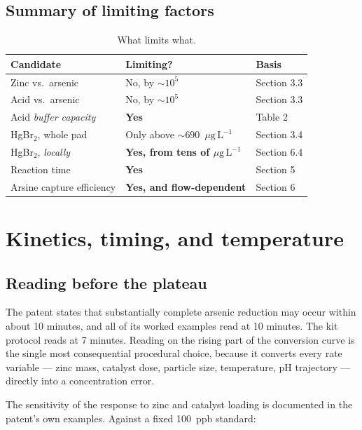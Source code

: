 \documentclass[11pt,a4paper]{article}
\newcommand{\ptl}{\ensuremath{\mu\mathrm{g\,L^{-1}}}}
\begin{document}
\subsection{Summary of limiting factors}

\begin{table}[h]
\centering
\caption{What limits what.}
\begin{tabular}{lll}
\toprule
Candidate & Limiting? & Basis \\
\midrule
Zinc vs.\ arsenic       & No, by $\sim\!10^5$ & Section 3.3 \\
Acid vs.\ arsenic       & No, by $\sim\!10^5$ & Section 3.3 \\
Acid \emph{buffer capacity} & \textbf{Yes} & Table 2 \\
HgBr$_2$, whole pad     & Only above $\sim\!690$~\ptl{} & Section 3.4 \\
HgBr$_2$, \emph{locally}& \textbf{Yes, from tens of \ptl{}}
                                              & Section 6.4 \\
Reaction time           & \textbf{Yes} & Section 5 \\
Arsine capture efficiency & \textbf{Yes, and flow-dependent}
                                              & Section 6 \\
\bottomrule
\end{tabular}
\end{table}

\section{Kinetics, timing, and temperature}

\subsection{Reading before the plateau}

The patent states that substantially complete arsenic reduction may occur
within about 10 minutes, and all of its worked examples read at 10 minutes.
The kit protocol reads at 7 minutes. Reading on the rising part of the
conversion curve is the single most consequential procedural choice, because
it converts every rate variable --- zinc mass, catalyst dose, particle size,
temperature, pH trajectory --- directly into a concentration error.

The sensitivity of the response to zinc and catalyst loading is documented
in the patent's own examples. Against a fixed 100~ppb standard:
\end{document}

